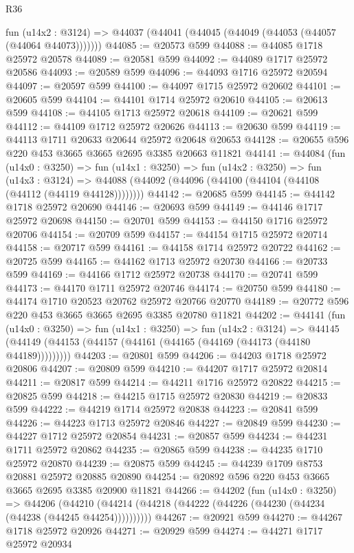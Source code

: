 \begin{lexlean}{R36}
\begin{coremodule}
    fun (u14x2 : @3124) => @44037 (@44041 (@44045 (@44049 (@44053 (@44057 (@44064 @44073)))))))
@44085 := @20573 @599
@44088 := @44085 @1718 @25972 @20578
@44089 := @20581 @599
@44092 := @44089 @1717 @25972 @20586
@44093 := @20589 @599
@44096 := @44093 @1716 @25972 @20594
@44097 := @20597 @599
@44100 := @44097 @1715 @25972 @20602
@44101 := @20605 @599
@44104 := @44101 @1714 @25972 @20610
@44105 := @20613 @599
@44108 := @44105 @1713 @25972 @20618
@44109 := @20621 @599
@44112 := @44109 @1712 @25972 @20626
@44113 := @20630 @599
@44119 := @44113 @1711 @20633 @20644 @25972 @20648 @20653
@44128 := @20655 @596 @220 @453 @3665 @3665 @2695 @3385 @20663 @11821
@44141 := @44084
    (fun (u14x0 : @3250) =>
    fun (u14x1 : @3250) =>
    fun (u14x2 : @3250) =>
    fun (u14x3 : @3124) =>
    @44088 (@44092 (@44096 (@44100 (@44104 (@44108 (@44112 (@44119 @44128))))))))
@44142 := @20685 @599
@44145 := @44142 @1718 @25972 @20690
@44146 := @20693 @599
@44149 := @44146 @1717 @25972 @20698
@44150 := @20701 @599
@44153 := @44150 @1716 @25972 @20706
@44154 := @20709 @599
@44157 := @44154 @1715 @25972 @20714
@44158 := @20717 @599
@44161 := @44158 @1714 @25972 @20722
@44162 := @20725 @599
@44165 := @44162 @1713 @25972 @20730
@44166 := @20733 @599
@44169 := @44166 @1712 @25972 @20738
@44170 := @20741 @599
@44173 := @44170 @1711 @25972 @20746
@44174 := @20750 @599
@44180 := @44174 @1710 @20523 @20762 @25972 @20766 @20770
@44189 := @20772 @596 @220 @453 @3665 @3665 @2695 @3385 @20780 @11821
@44202 := @44141
    (fun (u14x0 : @3250) =>
    fun (u14x1 : @3250) =>
    fun (u14x2 : @3124) =>
    @44145 (@44149 (@44153 (@44157 (@44161 (@44165 (@44169 (@44173 (@44180 @44189)))))))))
@44203 := @20801 @599
@44206 := @44203 @1718 @25972 @20806
@44207 := @20809 @599
@44210 := @44207 @1717 @25972 @20814
@44211 := @20817 @599
@44214 := @44211 @1716 @25972 @20822
@44215 := @20825 @599
@44218 := @44215 @1715 @25972 @20830
@44219 := @20833 @599
@44222 := @44219 @1714 @25972 @20838
@44223 := @20841 @599
@44226 := @44223 @1713 @25972 @20846
@44227 := @20849 @599
@44230 := @44227 @1712 @25972 @20854
@44231 := @20857 @599
@44234 := @44231 @1711 @25972 @20862
@44235 := @20865 @599
@44238 := @44235 @1710 @25972 @20870
@44239 := @20875 @599
@44245 := @44239 @1709 @8753 @20881 @25972 @20885 @20890
@44254 := @20892 @596 @220 @453 @3665 @3665 @2695 @3385 @20900 @11821
@44266 := @44202
    (fun (u14x0 : @3250) =>
    @44206 (@44210 (@44214 (@44218 (@44222 (@44226 (@44230 (@44234 (@44238 (@44245 @44254))))))))))
@44267 := @20921 @599
@44270 := @44267 @1718 @25972 @20926
@44271 := @20929 @599
@44274 := @44271 @1717 @25972 @20934

\end{coremodule}
\end{lexlean}
